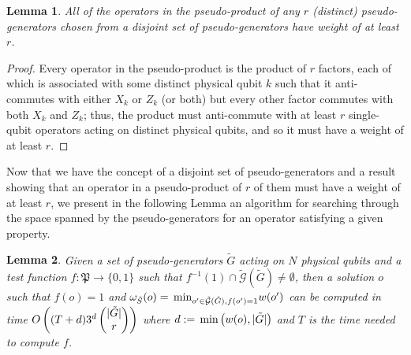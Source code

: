 \documentclass[twocolumn,showpacs,preprintnumbers,amsmath,amssymb,nofootinbib,pra,floatfix]{revtex4-1}
\newtheorem{lemma}{Lemma}
\newenvironment{remark}[1][Remark]{\begin{trivlist}
\item[\hskip \labelsep {\bfseries #1}]}{\end{trivlist}}
\newcommand{\set}{\tilde}
\newcommand{\genfun}{\tilde{\mathcal{G}}}
\newcommand{\pauligroup}{\mathfrak{P}}
\begin{document}
\begin{lemma}
\label{lemma:disjoint-pseudo-generators-bound}
All of the operators in the pseudo-product of any $r$ (distinct) pseudo-generators chosen from a disjoint set of pseudo-generators have weight of at least $r$.
\end{lemma}

\begin{proof}
Every operator in the pseudo-product is the product of $r$ factors, each of which is associated with some distinct physical qubit $k$ such that it anti-commutes with either $X_k$ or $Z_k$ (or both) but every other factor commutes with both $X_k$ and $Z_k$;  thus, the product must anti-commute with at least $r$ single-qubit operators acting on distinct physical qubits, and so it must have a weight of at least $r$.
\end{proof}
\begin{remark}
Now that we have the concept of a disjoint set of pseudo-generators and a result showing that an operator in a pseudo-product of $r$ of them must have a weight of at least $r$, we present in the following Lemma an algorithm for searching through the space spanned by the pseudo-generators for an operator satisfying a given property.
\end{remark}

\begin{lemma}
\label{lemma:minimal-weight-search}
Given a set of pseudo-generators $\set G$ acting on $N$ physical qubits and a test function $f:\pauligroup\to\{0,1\}$ such that $f^{-1}(1)\cap\genfun(\set G)\ne\emptyset$, then a solution $o$ such that $f(o)=1$ and $\om_{\set S}(o)=\min_{o'\in \genfun(\set G), f(o')=1} w(o')$ can be computed in time $O\paren{(T+d)3^d\choose{|\set G|}{r}}$ where $d:=\min\paren{w(o),|\set G|}$ and $T$ is the time needed to compute $f$.
\end{lemma}
\end{document}
